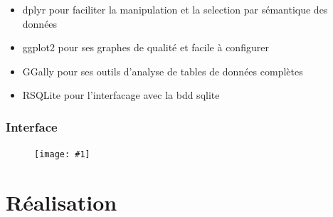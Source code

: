 \documentclass[
	headsepline=on,
	footsepline=on,
	twoside=off,
	abstract=on,
	DIV=10
]{scrreprt}
\newcommand{\img}[1]{
\begin{figure}[H]
	\centering
	\texttt{[image: \#1]}
\end{figure}
}
\begin{document}
				\begin{itemize}
					\item dplyr pour faciliter la manipulation et la selection par sémantique des données
					\item ggplot2 pour ses graphes de qualité et facile à configurer
					\item GGally pour ses outils d'analyse de tables de données complètes
					\item RSQLite pour l'interfacage avec la bdd sqlite
				\end{itemize}
			
			\section{Interface}
				\img{pics/interface.png}

		
			
	\part{Réalisation}
		
		
		
		
		
		
		
		
		
		
		
		
\end{document}
